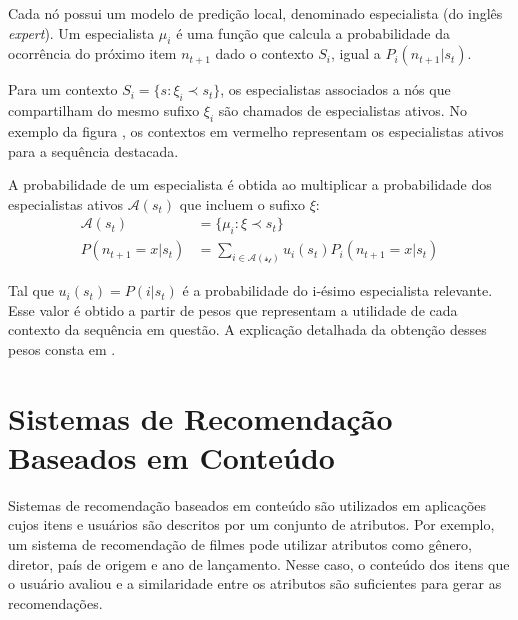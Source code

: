 Cada nó possui um modelo de predição local, denominado especialista (do inglês
\textit{expert}). Um especialista $\mu_i$ é uma função que calcula a
probabilidade da ocorrência do próximo item $n_{t+1}$ dado o contexto $S_i$, igual a
$P_i(n_{t+1} | s_t)$.

Para um contexto $S_i = \{s: \xi_i \prec s_t\}$, os especialistas associados a
nós que compartilham do mesmo sufixo $\xi_i$ são chamados de especialistas
ativos. No exemplo da figura \label{fig:context_tree}, os contextos em vermelho
representam os especialistas ativos para a sequência destacada.

A probabilidade de um especialista é obtida ao multiplicar a probabilidade dos
especialistas ativos $\mathcal{A}(s_t)$
 que incluem o sufixo $\xi$:
\begin{align}
    \mathcal{A}(s_t) &= \{\mu_i : \xi \prec s_t\}\\
    P(n_{t+1} = x | s_t) &= \sum_{i \in \mathcal{A(s_t)}} u_i(s_t)  P_i(n_{t+1} = x | s_t)
\end{align}

Tal que $u_i (s_t) = P(i|s_t)$ é a probabilidade do i-ésimo especialista
relevante. Esse valor é obtido a partir de pesos que representam a utilidade de
cada contexto da sequência em questão. A explicação detalhada da obtenção
desses pesos consta em \citet{mi2018context}.















\section{Sistemas de Recomendação Baseados em Conteúdo}

Sistemas de recomendação baseados em conteúdo são utilizados em aplicações cujos
itens e usuários são descritos por um conjunto de atributos. Por exemplo, um
sistema de recomendação de filmes pode utilizar atributos como gênero, diretor,
país de origem e ano de lançamento. Nesse caso, o conteúdo dos itens que o
usuário avaliou e a similaridade entre os atributos são
suficientes para gerar as recomendações.


